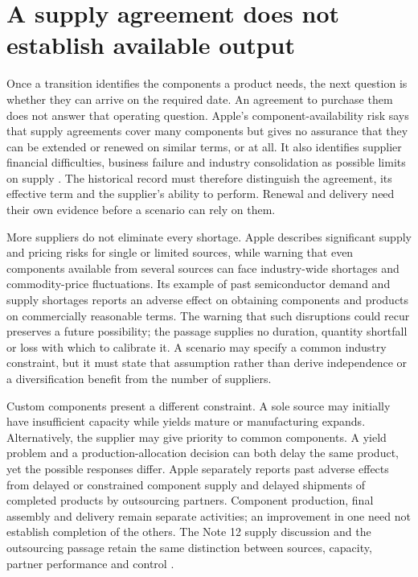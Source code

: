 \section{A supply agreement does not establish available output}
\label{sec:apple-component-availability}

Once a transition identifies the components a product needs, the next question
is whether they can arrive on the required date. An agreement to purchase them
does not answer that operating question. Apple's component-availability risk
says that supply agreements cover many components but gives no assurance that
they can be extended or renewed on similar terms, or at all. It also identifies
supplier financial difficulties, business failure and industry consolidation as
possible limits on supply \citep[Risk Factors, printed p.~8]{apple2024}.
The historical record must therefore distinguish the agreement, its effective
term and the supplier's ability to perform. Renewal and delivery need their
own evidence before a scenario can rely on them.

More suppliers do not eliminate every shortage. Apple describes significant
supply and pricing risks for single or limited sources, while warning that
even components available from several sources can face industry-wide shortages
and commodity-price fluctuations. Its example of past semiconductor demand
and supply shortages reports an adverse effect on obtaining components and
products on commercially reasonable terms. The warning that such disruptions
could recur preserves a future possibility; the passage supplies no duration,
quantity shortfall or loss with which to calibrate it. A scenario may specify a
common industry constraint, but it must state that assumption rather than
derive independence or a diversification benefit from the number of suppliers.

Custom components present a different constraint. A sole source may initially
have insufficient capacity while yields mature or manufacturing expands.
Alternatively, the supplier may give priority to common components. A yield
problem and a production-allocation decision can both delay the same product,
yet the possible responses differ. Apple separately reports past adverse
effects from delayed or constrained component supply and delayed shipments of
completed products by outsourcing partners. Component production, final
assembly and delivery remain separate activities; an improvement in one need
not establish completion of the others. The Note 12 supply discussion and the
outsourcing passage retain the same distinction between sources, capacity,
partner performance and control \citep[Note 12, printed p.~46; Risk Factors,
printed p.~8]{apple2024}.


